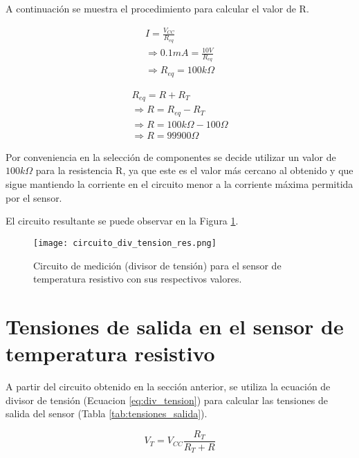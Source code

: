 \documentclass[journal,trans]{IEEEtran}
\begin{document}
A continuación se muestra el procedimiento para calcular el valor de R.

\begin{gather*}
    I = \frac{V_{CC}}{R_{eq}} \\
    \Longrightarrow 0.1 mA = \frac{10 V}{R_{eq}} \\
    \Longrightarrow R_{eq} = 100 k\Omega
\end{gather*}

\begin{gather*}
    R_{eq} = R + R_{T} \\
    \Longrightarrow R = R_{eq} - R_{T} \\
    \Longrightarrow R = 100 k\Omega - 100 \Omega \\
    \Longrightarrow R = 99 900 \Omega
\end{gather*}

Por conveniencia en la selección de componentes se decide utilizar un valor de $100 k\Omega$ para la resistencia R, ya que este es el valor más cercano al obtenido y que sigue mantiendo la corriente en el circuito menor a la corriente máxima permitida por el sensor.

El circuito resultante se puede observar en la Figura \ref{fig:circuito_div_tension_res}.

\begin{figure}[hbtp]
	\centering
	\texttt{[image: circuito\_div\_tension\_res.png]}
	\caption[Figura 2]{Circuito de medición (divisor de tensión) para el sensor de temperatura resistivo con sus respectivos valores.}
    \label{fig:circuito_div_tension_res}
\end{figure}

\section{Tensiones de salida en el sensor de temperatura resistivo} 
A partir del circuito obtenido en la sección anterior, se utiliza la ecuación de divisor de tensión (Ecuacion \ref{eq:div_tension}) para calcular las tensiones de salida del sensor (Tabla \ref{tab:tensiones_salida}).

\begin{equation} \label{eq:div_tension}
    V_{T} = V_{CC}\frac{R_{T}}{R_{T}+R}
\end{equation}
\end{document}
